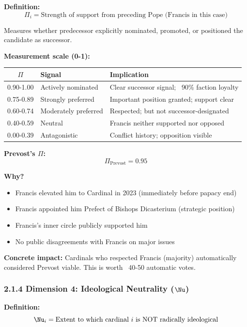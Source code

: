 \documentclass[11pt]{article}
\begin{document}
\textbf{Definition:}
$$\Pi_i = \text{Strength of support from preceding Pope (Francis in this case)}$$

Measures whether predecessor explicitly nominated, promoted, or positioned the candidate as successor.

\textbf{Measurement scale (0-1):}

\begin{table}[h]
\centering
\begin{tabular}{|c|l|l|}
\hline
$\Pi$ & \textbf{Signal} & \textbf{Implication} \\
\hline
0.90-1.00 & Actively nominated & Clear successor signal; ~90\% faction loyalty \\
0.75-0.89 & Strongly preferred & Important position granted; support clear \\
0.60-0.74 & Moderately preferred & Respected; but not successor-designated \\
0.40-0.59 & Neutral & Francis neither supported nor opposed \\
0.00-0.39 & Antagonistic & Conflict history; opposition visible \\
\hline
\end{tabular}
\end{table}

\textbf{Prevost's $\Pi$:}
$$\Pi_{\text{Prevost}} = 0.95$$

\textbf{Why?}
\begin{itemize}
\item Francis elevated him to Cardinal in 2023 (immediately before papacy end)
\item Francis appointed him Prefect of Bishops Dicasterium (strategic position)
\item Francis's inner circle publicly supported him
\item No public disagreements with Francis on major issues
\end{itemize}

\textbf{Concrete impact:} Cardinals who respected Francis (majority) automatically considered Prevost viable. This is worth ~40-50 automatic votes.

\subsubsection{2.1.4 Dimension 4: Ideological Neutrality ($\Nu$)}

\textbf{Definition:}
$$\Nu_i = \text{Extent to which cardinal } i \text{ is NOT radically ideological}$$
\end{document}
